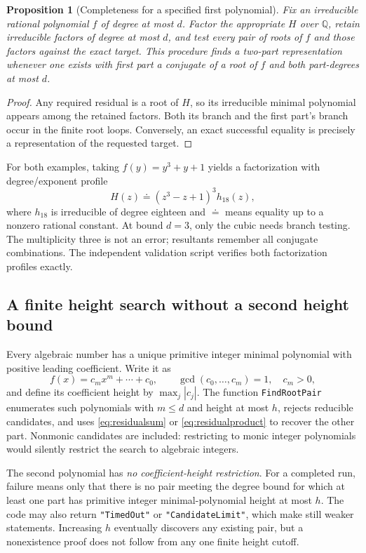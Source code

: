 \documentclass[11pt,a4paper]{article}
\newtheorem{proposition}[theorem]{Proposition}
\theoremstyle{definition}\newtheorem{definition}[theorem]{Definition}
\theoremstyle{remark}\newtheorem{remark}[theorem]{Remark}
\newcommand{\Q}{\mathbb{Q}}\newcommand{\C}{\mathbb{C}}
\newcommand{\code}[1]{\texttt{#1}}
\begin{document}
\begin{proposition}[Completeness for a specified first polynomial]
Fix an irreducible rational polynomial $f$ of degree at most $d$. Factor the appropriate $H$ over $\Q$, retain irreducible factors of degree at most $d$, and test every pair of roots of $f$ and those factors against the exact target. This procedure finds a two-part representation whenever one exists with first part a conjugate of a root of $f$ and both part-degrees at most $d$.
\end{proposition}
\begin{proof}
Any required residual is a root of $H$, so its irreducible minimal polynomial appears among the retained factors. Both its branch and the first part's branch occur in the finite root loops. Conversely, an exact successful equality is precisely a representation of the requested target.\end{proof}

For both examples, taking $f(y)=y^3+y+1$ yields a factorization with degree/exponent profile
\[
H(z)\doteq(z^3-z+1)^3 h_{18}(z),
\]
where $h_{18}$ is irreducible of degree eighteen and $\doteq$ means equality up to a nonzero rational constant. At bound $d=3$, only the cubic needs branch testing. The multiplicity three is not an error; resultants remember all conjugate combinations. The independent validation script verifies both factorization profiles exactly.

\subsection{A finite height search without a second height bound}
Every algebraic number has a unique primitive integer minimal polynomial with positive leading coefficient. Write it as
\[
f(x)=c_m x^m+\cdots+c_0,\qquad
\gcd(c_0,\ldots,c_m)=1,\quad c_m>0,
\]
and define its coefficient height by $\max_j|c_j|$. The function \code{FindRootPair} enumerates such polynomials with $m\leq d$ and height at most $h$, rejects reducible candidates, and uses \eqref{eq:residualsum} or \eqref{eq:residualproduct} to recover the other part. Nonmonic candidates are included: restricting to monic integer polynomials would silently restrict the search to algebraic integers.

The second polynomial has \emph{no coefficient-height restriction}. For a completed run, failure means only that there is no pair meeting the degree bound for which at least one part has primitive integer minimal-polynomial height at most $h$. The code may also return \code{"TimedOut"} or \code{"CandidateLimit"}, which make still weaker statements. Increasing $h$ eventually discovers any existing pair, but a nonexistence proof does not follow from any one finite height cutoff.
\end{document}
